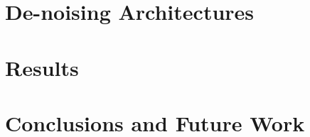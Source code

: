 \documentclass[12pt]{article}
\begin{document}
\section{De-noising Architectures}

\newpage


\section{Results}

\newpage


\section{Conclusions and Future Work}


\newpage

\nocite{*}
\fontsize{12pt}{16pt}\selectfont
{}

\end{document}
